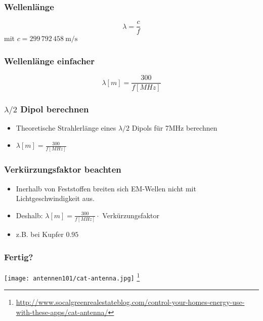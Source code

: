\begin{frame}
    \frametitle{Wellenlänge}
    \begin{center} \huge
        $$\lambda = \frac{c}{f}$$
      	mit $c = 299\,792\,458 ~ \mathrm{m/s}$
	\end{center}
\end{frame}

\begin{frame}
    \frametitle{Wellenlänge einfacher}
    \begin{center} \huge
        $$\lambda [m] = \frac{300}{f[MHz]}$$
	\end{center}
\end{frame}

\begin{frame}
    \frametitle{$\lambda / 2$ Dipol berechnen}
    \begin{center}
	\begin{itemize} \Large
		\item Theoretische Strahlerlänge eines $\lambda / 2$ Dipols für 7MHz berechnen
		\item $\lambda[m] = \frac{300}{f[MHz]}$
    \end{itemize}
    \end{center}
\end{frame}

\begin{frame}
    \frametitle{Verkürzungsfaktor beachten}
    \begin{center}
	\begin{itemize} \Large
		\item Inerhalb von Feststoffen breiten sich EM-Wellen nicht mit Lichtgeschwindigkeit aus.
		\item Deshalb: $\lambda[m] = \frac{300}{f[MHz]} \cdot $ Verkürzungsfaktor
		\item z.B. bei Kupfer $0.95$
    \end{itemize}
    \end{center}
\end{frame}

\begin{frame}
    \frametitle{Fertig?}
    \begin{center}
        \texttt{[image: antennen101/cat-antenna.jpg]}
        \footnote{\tiny \url{http://www.socalgreenrealestateblog.com/control-your-homes-energy-use-with-these-apps/cat-antenna/}}
	\end{center}
\end{frame}

